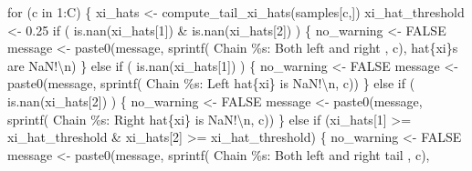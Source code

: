 \documentclass[
  letterpaper,
  DIV=11,
  numbers=noendperiod]{scrartcl}
\newenvironment{Shaded}{\begin{snugshade}}{\end{snugshade}}
\newcommand{\ConstantTok}[1]{\textcolor[rgb]{0.56,0.35,0.01}{#1}}
\newcommand{\ControlFlowTok}[1]{\textcolor[rgb]{0.00,0.23,0.31}{#1}}
\newcommand{\DecValTok}[1]{\textcolor[rgb]{0.68,0.00,0.00}{#1}}
\newcommand{\FloatTok}[1]{\textcolor[rgb]{0.68,0.00,0.00}{#1}}
\newcommand{\FunctionTok}[1]{\textcolor[rgb]{0.28,0.35,0.67}{#1}}
\newcommand{\NormalTok}[1]{\textcolor[rgb]{0.00,0.23,0.31}{#1}}
\newcommand{\OtherTok}[1]{\textcolor[rgb]{0.00,0.23,0.31}{#1}}
\newcommand{\SpecialCharTok}[1]{\textcolor[rgb]{0.37,0.37,0.37}{#1}}
\newcommand{\StringTok}[1]{\textcolor[rgb]{0.13,0.47,0.30}{#1}}
\begin{document}
\begin{Shaded}
\begin{Highlighting}[]
  \ControlFlowTok{for}\NormalTok{ (c }\ControlFlowTok{in} \DecValTok{1}\SpecialCharTok{:}\NormalTok{C) \{}
\NormalTok{    xi\_hats }\OtherTok{\textless{}{-}} \FunctionTok{compute\_tail\_xi\_hats}\NormalTok{(samples[c,])}
\NormalTok{    xi\_hat\_threshold }\OtherTok{\textless{}{-}} \FloatTok{0.25}
    \ControlFlowTok{if}\NormalTok{ ( }\FunctionTok{is.nan}\NormalTok{(xi\_hats[}\DecValTok{1}\NormalTok{]) }\SpecialCharTok{\&} \FunctionTok{is.nan}\NormalTok{(xi\_hats[}\DecValTok{2}\NormalTok{]) ) \{}
\NormalTok{      no\_warning }\OtherTok{\textless{}{-}} \ConstantTok{FALSE}
\NormalTok{      message }\OtherTok{\textless{}{-}}
        \FunctionTok{paste0}\NormalTok{(message,}
               \FunctionTok{sprintf}\NormalTok{(}\StringTok{\textquotesingle{}  Chain \%s: Both left and right \textquotesingle{}}\NormalTok{, c),}
               \StringTok{\textquotesingle{}hat\{xi\}s are NaN!}\SpecialCharTok{\textbackslash{}n}\StringTok{\textquotesingle{}}\NormalTok{)}
\NormalTok{    \} }
    \ControlFlowTok{else} \ControlFlowTok{if}\NormalTok{ ( }\FunctionTok{is.nan}\NormalTok{(xi\_hats[}\DecValTok{1}\NormalTok{]) ) \{}
\NormalTok{      no\_warning }\OtherTok{\textless{}{-}} \ConstantTok{FALSE}
\NormalTok{      message }\OtherTok{\textless{}{-}}
        \FunctionTok{paste0}\NormalTok{(message,}
               \FunctionTok{sprintf}\NormalTok{(}\StringTok{\textquotesingle{}  Chain \%s: Left hat\{xi\} is NaN!}\SpecialCharTok{\textbackslash{}n}\StringTok{\textquotesingle{}}\NormalTok{, c))}
\NormalTok{    \} }\ControlFlowTok{else} \ControlFlowTok{if}\NormalTok{ ( }\FunctionTok{is.nan}\NormalTok{(xi\_hats[}\DecValTok{2}\NormalTok{]) ) \{}
\NormalTok{      no\_warning }\OtherTok{\textless{}{-}} \ConstantTok{FALSE}
\NormalTok{      message }\OtherTok{\textless{}{-}}
        \FunctionTok{paste0}\NormalTok{(message,}
               \FunctionTok{sprintf}\NormalTok{(}\StringTok{\textquotesingle{}  Chain \%s: Right hat\{xi\} is NaN!}\SpecialCharTok{\textbackslash{}n}\StringTok{\textquotesingle{}}\NormalTok{, c))}
\NormalTok{    \} }\ControlFlowTok{else} \ControlFlowTok{if}\NormalTok{ (xi\_hats[}\DecValTok{1}\NormalTok{] }\SpecialCharTok{\textgreater{}=}\NormalTok{ xi\_hat\_threshold }\SpecialCharTok{\&} 
\NormalTok{      xi\_hats[}\DecValTok{2}\NormalTok{] }\SpecialCharTok{\textgreater{}=}\NormalTok{ xi\_hat\_threshold) \{}
\NormalTok{      no\_warning }\OtherTok{\textless{}{-}} \ConstantTok{FALSE}
\NormalTok{      message }\OtherTok{\textless{}{-}}
        \FunctionTok{paste0}\NormalTok{(message,}
              \FunctionTok{sprintf}\NormalTok{(}\StringTok{\textquotesingle{}  Chain \%s: Both left and right tail \textquotesingle{}}\NormalTok{, c),}

\end{Highlighting}
\end{Shaded}
\end{document}
